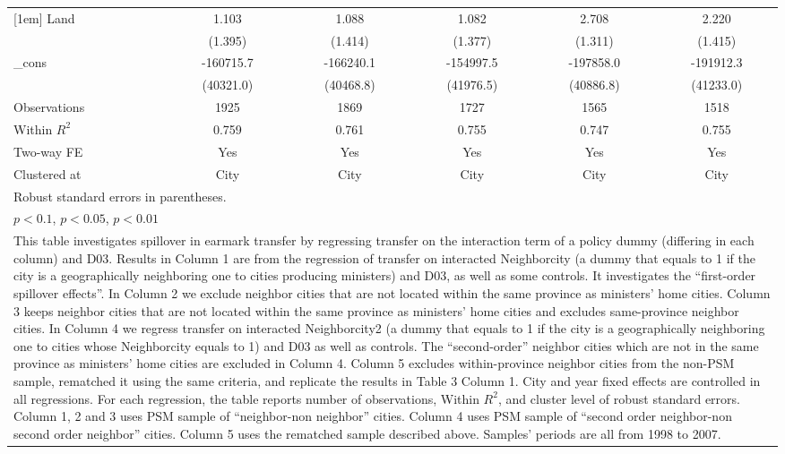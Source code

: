 \documentclass[11pt,a4paper]{article}
\begin{document}
\begin{center}
\begin{scriptsize}
{\begin{tabular}{l*{5}{c}}
[1em]
Land        &       1.103         &       1.088        &       1.082       &     2.708\sym{**}    &       2.220          \\
            &     (1.395)         &     (1.414)      &     (1.377)       &      (1.311)        &     (1.415)           \\
[1em]
\_cons      &   -160715.7\sym{***}&   -166240.1\sym{***}&   -154997.5\sym{***}  &   -197858.0\sym{***} &   -191912.3\sym{***}\\
            &   (40321.0)         &   (40468.8)    &   (41976.5)      &   (40886.8)     &   (41233.0)      \\
\hline
Observations       &        1925         &        1869      &        1727        &        1565        &        1518   \\
Within $R^{2}$      &       0.759         &       0.761  &       0.755         &      0.747     &       0.755     \\
Two-way FE    &    Yes    &   Yes   & Yes    &   Yes  & Yes  \\
Clustered at     &        City         &        City    & City     &        City  &  City        \\
\hline\hline
\multicolumn{6}{l}{\footnotesize Robust standard errors in parentheses.}\\
\multicolumn{6}{l}{\footnotesize \sym{*} \(p<0.1\), \sym{**} \(p<0.05\), \sym{***} \(p<0.01\)}\\
\multicolumn{6}{p{13cm}}{\footnotesize This table investigates spillover in earmark transfer by regressing transfer on the interaction term of a policy dummy (differing in each column) and D03. Results in Column 1 are from the regression of transfer on interacted Neighborcity (a dummy that equals to 1 if the city is a geographically neighboring one to cities producing ministers) and D03, as well as some controls. It investigates the ``first-order spillover effects''. In Column 2 we exclude neighbor cities that are not located within the same province as ministers' home cities. Column 3 keeps neighbor cities that are not located within the same province as ministers' home cities and excludes same-province neighbor cities. In Column 4 we regress transfer on interacted Neighborcity2 (a dummy that equals to 1 if the city is a geographically neighboring one to cities whose Neighborcity equals to 1) and D03 as well as controls. The ``second-order'' neighbor cities which are not in the same province as ministers' home cities are excluded in Column 4. Column 5 excludes within-province neighbor cities from the non-PSM sample, rematched it using the same criteria, and replicate the results in Table 3 Column 1. City and year fixed effects are controlled in all regressions. For each regression, the table reports number of observations, Within $R^{2}$, and cluster level of robust standard errors. Column 1, 2 and 3 uses PSM sample of ``neighbor-non neighbor'' cities. Column 4 uses PSM sample of ``second order neighbor-non second order neighbor'' cities. Column 5 uses the rematched sample described above. Samples' periods are all from 1998 to 2007. }\\

\end{tabular}}
\end{scriptsize}
\end{center}
\end{document}
